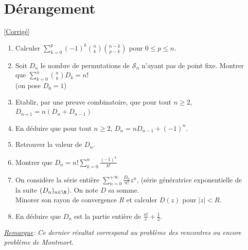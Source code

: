 \documentclass[8pt]{book}
\begin{document}
\section{Dérangement }
\label{Dérangement}
\textcolor{blue}{\hyperref[Dérangement corrigé]{[Corrigé]}}\\
\begin{enumerate}[leftmargin=*]
	\item Calculer $\displaystyle\sum\limits_{k=0}^p(-1)^k\binom{n}{k}\binom{n-k}{p-k}$ pour $0\leq p \leq n$.
	\item Soit $D_n$ le nombre de permutations de $\mathcal{S}_n$ n'ayant pas de point fixe. Montrer que $\displaystyle\sum\limits_{k=0}^n\binom{n}{k}D_{k}=n!$ \\(on pose $D_0=1$)
	\item Etablir, par une preuve combinatoire, que pour tout $n\geq 2$, $D_{n+1}=n(D_n+D_{n-1})$ 
	\item En déduire que pour tout $n\geq 2$, $D_n=nD_{n-1}+(-1)^n$.
	\item Retrouver la valeur de $D_n$.    
	\item Montrer que $D_n=n!\displaystyle\sum\limits_{k=0}^n\frac{(-1)^k}{k!}$
	\item On considère la série entière $\displaystyle\sum\limits_{n=0}^{+\infty}\frac{D_n}{n!}z^n$, (série génératrice exponentielle de la suite $(D_n)_{n\in \N}$). On note $D$ sa somme.\\ Minorer son rayon de convergence $R$ et calculer $D(z)$ pour $|z|<R$.
	\item En déduire que $D_n$ est la partie entière de $\displaystyle\frac{n!}{e}+\frac{1}{2}$.
\end{enumerate}
\textit{\underline{Remarque}: Ce dernier résultat correspond au problème des rencontres ou encore problème de Montmort.}
\end{document}
